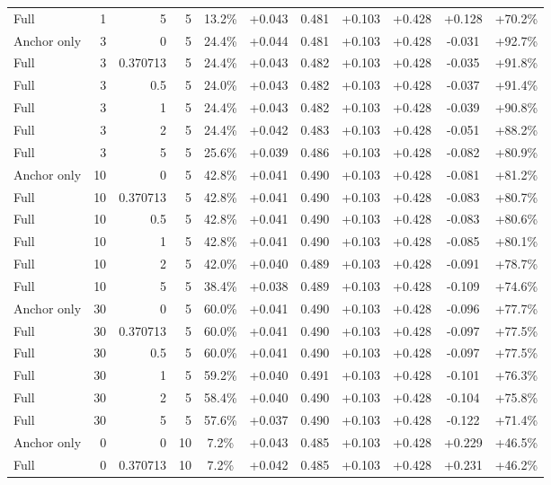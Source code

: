 \begin{table}[htbp]
\begin{tabular}{lrrrccccccc}
Full & 1 & 5 & 5 & 13.2\% & +0.043 & 0.481 & +0.103 & +0.428 & +0.128 & +70.2\% \\
Anchor only & 3 & 0 & 5 & 24.4\% & +0.044 & 0.481 & +0.103 & +0.428 & -0.031 & +92.7\% \\
Full & 3 & 0.370713 & 5 & 24.4\% & +0.043 & 0.482 & +0.103 & +0.428 & -0.035 & +91.8\% \\
Full & 3 & 0.5 & 5 & 24.0\% & +0.043 & 0.482 & +0.103 & +0.428 & -0.037 & +91.4\% \\
Full & 3 & 1 & 5 & 24.4\% & +0.043 & 0.482 & +0.103 & +0.428 & -0.039 & +90.8\% \\
Full & 3 & 2 & 5 & 24.4\% & +0.042 & 0.483 & +0.103 & +0.428 & -0.051 & +88.2\% \\
Full & 3 & 5 & 5 & 25.6\% & +0.039 & 0.486 & +0.103 & +0.428 & -0.082 & +80.9\% \\
Anchor only & 10 & 0 & 5 & 42.8\% & +0.041 & 0.490 & +0.103 & +0.428 & -0.081 & +81.2\% \\
Full & 10 & 0.370713 & 5 & 42.8\% & +0.041 & 0.490 & +0.103 & +0.428 & -0.083 & +80.7\% \\
Full & 10 & 0.5 & 5 & 42.8\% & +0.041 & 0.490 & +0.103 & +0.428 & -0.083 & +80.6\% \\
Full & 10 & 1 & 5 & 42.8\% & +0.041 & 0.490 & +0.103 & +0.428 & -0.085 & +80.1\% \\
Full & 10 & 2 & 5 & 42.0\% & +0.040 & 0.489 & +0.103 & +0.428 & -0.091 & +78.7\% \\
Full & 10 & 5 & 5 & 38.4\% & +0.038 & 0.489 & +0.103 & +0.428 & -0.109 & +74.6\% \\
Anchor only & 30 & 0 & 5 & 60.0\% & +0.041 & 0.490 & +0.103 & +0.428 & -0.096 & +77.7\% \\
Full & 30 & 0.370713 & 5 & 60.0\% & +0.041 & 0.490 & +0.103 & +0.428 & -0.097 & +77.5\% \\
Full & 30 & 0.5 & 5 & 60.0\% & +0.041 & 0.490 & +0.103 & +0.428 & -0.097 & +77.5\% \\
Full & 30 & 1 & 5 & 59.2\% & +0.040 & 0.491 & +0.103 & +0.428 & -0.101 & +76.3\% \\
Full & 30 & 2 & 5 & 58.4\% & +0.040 & 0.490 & +0.103 & +0.428 & -0.104 & +75.8\% \\
Full & 30 & 5 & 5 & 57.6\% & +0.037 & 0.490 & +0.103 & +0.428 & -0.122 & +71.4\% \\
Anchor only & 0 & 0 & 10 & 7.2\% & +0.043 & 0.485 & +0.103 & +0.428 & +0.229 & +46.5\% \\
Full & 0 & 0.370713 & 10 & 7.2\% & +0.042 & 0.485 & +0.103 & +0.428 & +0.231 & +46.2\% \\

\end{tabular}
\end{table}
